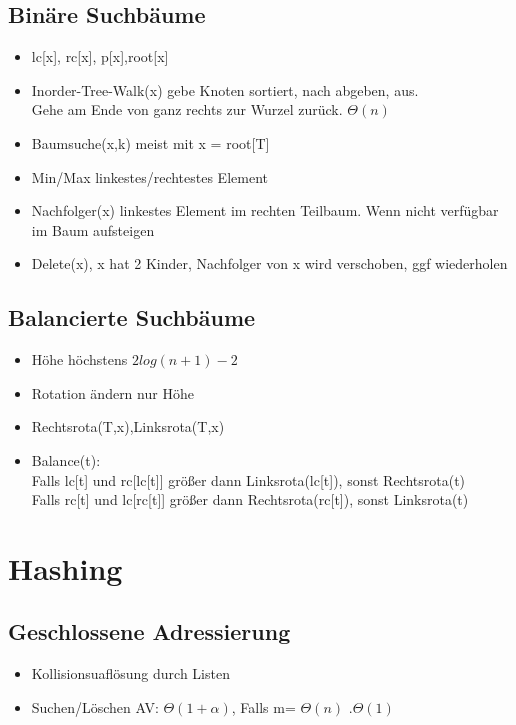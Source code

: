 \documentclass{article}
\begin{document}
\subsection{Bin{\"a}re Suchb{\"a}ume}
\begin{itemize}
\item lc[x], rc[x], p[x],root[x]
\item Inorder-Tree-Walk(x) gebe Knoten sortiert, nach abgeben, aus. \\ Gehe am Ende von ganz rechts zur Wurzel zur{\"u}ck. $\Theta(n)$
\item Baumsuche(x,k) meist mit x = root[T]
\item Min/Max linkestes/rechtestes Element
\item Nachfolger(x) linkestes Element im rechten Teilbaum. Wenn nicht verf{\"u}gbar im Baum aufsteigen
\item Delete(x), x hat 2 Kinder, Nachfolger von x wird verschoben, ggf wiederholen
\end{itemize}

\subsection{Balancierte Suchb{\"a}ume}
\begin{itemize}
\item H{\"o}he h{\"o}chstens $2log(n+1)-2$
\item Rotation {\"a}ndern nur H{\"o}he
\item Rechtsrota(T,x),Linksrota(T,x)
\item Balance(t): \\Falls lc[t] und rc[lc[t]] gr{\"o}\ss er dann Linksrota(lc[t]), sonst Rechtsrota(t) \\
	Falls rc[t] und lc[rc[t]] gr{\"o}\ss er dann Rechtsrota(rc[t]), sonst Linksrota(t)
\end{itemize}

\section{Hashing}
\subsection{Geschlossene Adressierung}
\begin{itemize}
\item Kollisionsuafl{\"o}sung durch Listen
\item Suchen/L{\"o}schen AV: $\Theta(1+\alpha)$, Falls  m= $\Theta(n)$ $.\Theta(1)$
\end{itemize}
\end{document}
